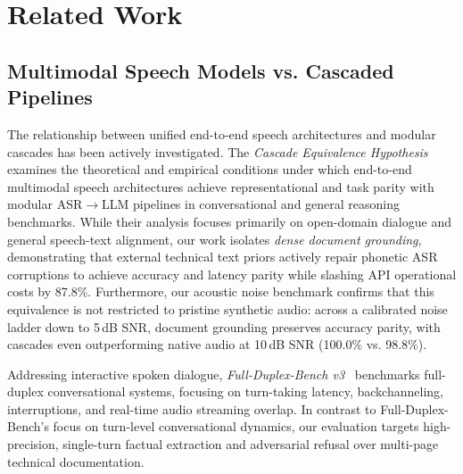 \documentclass[10pt,a4paper,twocolumn]{article}
\begin{document}
\section{Related Work}
\label{sec:related}

\subsection{Multimodal Speech Models vs. Cascaded Pipelines}
The relationship between unified end-to-end speech architectures and modular cascades has been actively investigated. The \textit{Cascade Equivalence Hypothesis}~\cite{cascade_equivalence_2026} examines the theoretical and empirical conditions under which end-to-end multimodal speech architectures achieve representational and task parity with modular ASR$\to$LLM pipelines in conversational and general reasoning benchmarks. While their analysis focuses primarily on open-domain dialogue and general speech-text alignment, our work isolates \textit{dense document grounding}, demonstrating that external technical text priors actively repair phonetic ASR corruptions to achieve accuracy and latency parity while slashing API operational costs by 87.8\%. Furthermore, our acoustic noise benchmark confirms that this equivalence is not restricted to pristine synthetic audio: across a calibrated noise ladder down to 5\,dB SNR, document grounding preserves accuracy parity, with cascades even outperforming native audio at 10\,dB SNR (100.0\% vs. 98.8\%).

Addressing interactive spoken dialogue, \textit{Full-Duplex-Bench v3}~\cite{fullduplex_bench_2026} benchmarks full-duplex conversational systems, focusing on turn-taking latency, backchanneling, interruptions, and real-time audio streaming overlap. In contrast to Full-Duplex-Bench's focus on turn-level conversational dynamics, our evaluation targets high-precision, single-turn factual extraction and adversarial refusal over multi-page technical documentation.
\end{document}
